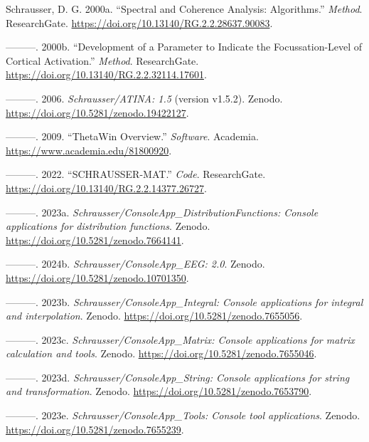 \documentclass[
]{article}
\newlength{\cslhangindent}
\newlength{\cslentryspacingunit} %
\newenvironment{CSLReferences}[2] %
 {%
  \setlength{\parindent}{0pt}
  \ifodd #1
  \let\oldpar\par
  \def\par{\hangindent=\cslhangindent\oldpar}
  \fi
  \setlength{\parskip}{#2\cslentryspacingunit}
 }%
 {}
\begin{document}
\begin{CSLReferences}{1}{0}
\leavevmode{}%
Schrausser, D. G. 2000a. {``{Spectral and Coherence Analysis:
Algorithms}.''} \emph{Method}. ResearchGate.
\url{https://doi.org/10.13140/RG.2.2.28637.90083}.

\leavevmode{}%
---------. 2000b. {``Development of a Parameter to Indicate the
Focussation-Level of Cortical Activation.''} \emph{Method}.
ResearchGate. \url{https://doi.org/10.13140/RG.2.2.32114.17601}.

\leavevmode{}%
---------. 2006. \emph{{Schrausser/ATINA: 1.5}} (version {v1.5.2}).
Zenodo. \url{https://doi.org/10.5281/zenodo.19422127}.

\leavevmode{}%
---------. 2009. {``{ThetaWin Overview}.''} \emph{Software}. Academia.
\url{https://www.academia.edu/81800920}.

\leavevmode{}%
---------. 2022. {``{SCHRAUSSER-MAT}.''} \emph{Code}. ResearchGate.
\url{https://doi.org/10.13140/RG.2.2.14377.26727}.

\leavevmode{}%
---------. 2023a. \emph{{Schrausser/ConsoleApp\_DistributionFunctions:
Console applications for distribution functions}}. Zenodo.
\url{https://doi.org/10.5281/zenodo.7664141}.

\leavevmode{}%
---------. 2024b. \emph{Schrausser/ConsoleApp\_EEG: 2.0}. Zenodo.
\url{https://doi.org/10.5281/zenodo.10701350}.

\leavevmode{}%
---------. 2023b. \emph{{Schrausser/ConsoleApp\_Integral: Console
applications for integral and interpolation}}. Zenodo.
\url{https://doi.org/10.5281/zenodo.7655056}.

\leavevmode{}%
---------. 2023c. \emph{{Schrausser/ConsoleApp\_Matrix: Console
applications for matrix calculation and tools}}. Zenodo.
\url{https://doi.org/10.5281/zenodo.7655046}.

\leavevmode{}%
---------. 2023d. \emph{{Schrausser/ConsoleApp\_String: Console
applications for string and transformation}}. Zenodo.
\url{https://doi.org/10.5281/zenodo.7653790}.

\leavevmode{}%
---------. 2023e. \emph{{Schrausser/ConsoleApp\_Tools: Console tool
applications}}. Zenodo. \url{https://doi.org/10.5281/zenodo.7655239}.


\end{CSLReferences}
\end{document}
